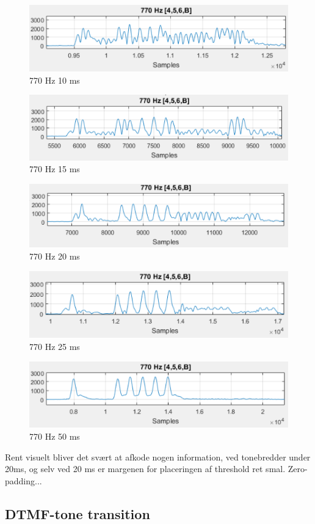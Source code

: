 \begin{figure}[h]
\centering
\includegraphics[scale=0.8]{Billeder/Speed10ms.PNG}
\caption{770 Hz 10 ms}
\label{fig:10ms}
\end{figure} 

\begin{figure}[h]
\centering
\includegraphics[scale=0.8]{Billeder/Speed15ms.PNG}
\caption{770 Hz 15 ms}
\label{fig:15ms}
\end{figure} 

\begin{figure}[h]
\centering
\includegraphics[scale=0.8]{Billeder/Speed20ms.PNG}
\caption{770 Hz 20 ms}
\label{fig:20ms}
\end{figure} 

\begin{figure}[h]
\centering
\includegraphics[scale=0.8]{Billeder/Speed25ms.PNG}
\caption{770 Hz 25 ms}
\label{fig:25ms}
\end{figure} 

\begin{figure}[h]
\centering
\includegraphics[scale=0.8]{Billeder/Speed50ms.PNG}
\caption{770 Hz 50 ms}
\label{fig:50ms}
\end{figure} 

Rent visuelt bliver det svært at afkode nogen information, ved tonebredder under 20ms, og selv ved 20 ms er margenen for placeringen af threshold ret smal.
Zero-padding...


\subsection{DTMF-tone transition}


